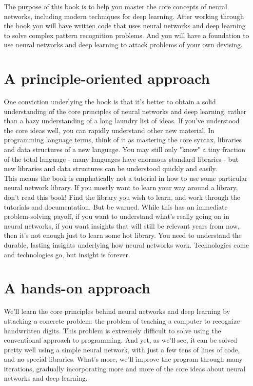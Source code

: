 The purpose of this book is to help you master the core concepts of neural networks, including modern techniques for deep learning. After working through the book you will have written code that uses neural networks and deep learning to solve complex pattern recognition problems. And you will have a foundation to use neural networks and deep learning to attack problems of your own devising.

\section*{A principle-oriented approach}
One conviction underlying the book is that it's better to obtain a solid understanding of the core principles of neural networks and deep learning, rather than a hazy understanding of a long laundry list of ideas. If you've understood the core ideas well, you can rapidly understand other new material. In programming language terms, think of it as mastering the core syntax, libraries and data structures of a new language. You may still only "know" a tiny fraction of the total language - many languages have enormous standard libraries - but new libraries and data structures can be understood quickly and easily.\\

This means the book is emphatically not a tutorial in how to use some particular neural network library. If you mostly want to learn your way around a library, don't read this book! Find the library you wish to learn, and work through the tutorials and documentation. But be warned. While this has an immediate problem-solving payoff, if you want to understand what's really going on in neural networks, if you want insights that will still be relevant years from now, then it's not enough just to learn some hot library. You need to understand the durable, lasting insights underlying how neural networks work. Technologies come and technologies go, but insight is forever.

\section*{A hands-on approach}
We'll learn the core principles behind neural networks and deep learning by attacking a concrete problem: the problem of teaching a computer to recognize handwritten digits. This problem is extremely difficult to solve using the conventional approach to programming. And yet, as we'll see, it can be solved pretty well using a simple neural network, with just a few tens of lines of code, and no special libraries. What's more, we'll improve the program through many iterations, gradually incorporating more and more of the core ideas about neural networks and deep learning.\\

